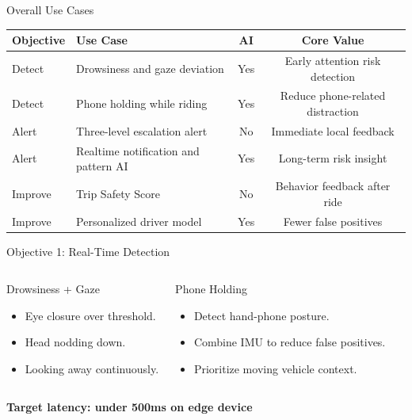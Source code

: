 \documentclass[aspectratio=169]{beamer}
\begin{document}
\begin{frame}{Overall Use Cases}
  \small
  \begin{tabularx}{\textwidth}{@{}lLcc@{}}
    \toprule
    \textbf{Objective} & \textbf{Use Case} & \textbf{AI} & \textbf{Core Value} \\
    \midrule
    Detect & Drowsiness and gaze deviation & Yes & Early attention risk detection \\
    Detect & Phone holding while riding & Yes & Reduce phone-related distraction \\
    Alert & Three-level escalation alert & No & Immediate local feedback \\
    Alert & Realtime notification and pattern AI & Yes & Long-term risk insight \\
    Improve & Trip Safety Score & No & Behavior feedback after ride \\
    Improve & Personalized driver model & Yes & Fewer false positives \\
    \bottomrule
  \end{tabularx}
\end{frame}

\begin{frame}{Objective 1: Real-Time Detection}
  \begin{columns}
    \begin{block}{Drowsiness + Gaze}
      \begin{itemize}
        \item Eye closure over threshold.
        \item Head nodding down.
        \item Looking away continuously.
      \end{itemize}
    \end{block}
    \begin{block}{Phone Holding}
      \begin{itemize}
        \item Detect hand-phone posture.
        \item Combine IMU to reduce false positives.
        \item Prioritize moving vehicle context.
      \end{itemize}
    \end{block}
  \end{columns}
  \vspace{0.3cm}
  \begin{center}
    \textbf{Target latency: under 500ms on edge device}
  \end{center}
\end{frame}
\end{document}
